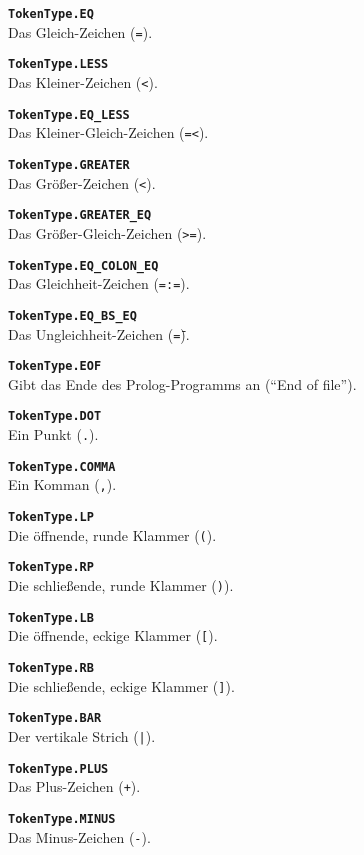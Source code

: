 \documentclass[parskip=full,11pt,twoside]{scrartcl}
\begin{document}
\textbf{\texttt{TokenType.EQ}}\\
Das Gleich-Zeichen (\texttt{=}).

\textbf{\texttt{TokenType.LESS}}\\
Das Kleiner-Zeichen (\texttt{<}).

\textbf{\texttt{TokenType.EQ\_LESS}}\\
Das Kleiner-Gleich-Zeichen (\texttt{=<}).

\textbf{\texttt{TokenType.GREATER}}\\
Das Größer-Zeichen (\texttt{<}).

\textbf{\texttt{TokenType.GREATER\_EQ}}\\
Das Größer-Gleich-Zeichen (\texttt{>=}).

\textbf{\texttt{TokenType.EQ\_COLON\_EQ}}\\
Das Gleichheit-Zeichen (\texttt{=:=}).

\textbf{\texttt{TokenType.EQ\_BS\_EQ}}\\
Das Ungleichheit-Zeichen (\texttt{=\=}).

\textbf{\texttt{TokenType.EOF}}\\
Gibt das Ende des Prolog-Programms an (\enquote{End of file}).

\textbf{\texttt{TokenType.DOT}}\\
Ein Punkt (\texttt{.}).

\textbf{\texttt{TokenType.COMMA}}\\
Ein Komman (\texttt{,}).

\textbf{\texttt{TokenType.LP}}\\
Die öffnende, runde Klammer (\texttt{(}).

\textbf{\texttt{TokenType.RP}}\\
Die schließende, runde Klammer (\texttt{)}).

\textbf{\texttt{TokenType.LB}}\\
Die öffnende, eckige Klammer (\texttt{[}).

\textbf{\texttt{TokenType.RB}}\\
Die schließende, eckige Klammer (\texttt{]}).

\textbf{\texttt{TokenType.BAR}}\\
Der vertikale Strich (\texttt{|}).

\textbf{\texttt{TokenType.PLUS}}\\
Das Plus-Zeichen (\texttt{+}).

\textbf{\texttt{TokenType.MINUS}}\\
Das Minus-Zeichen (\texttt{-}).
\end{document}
